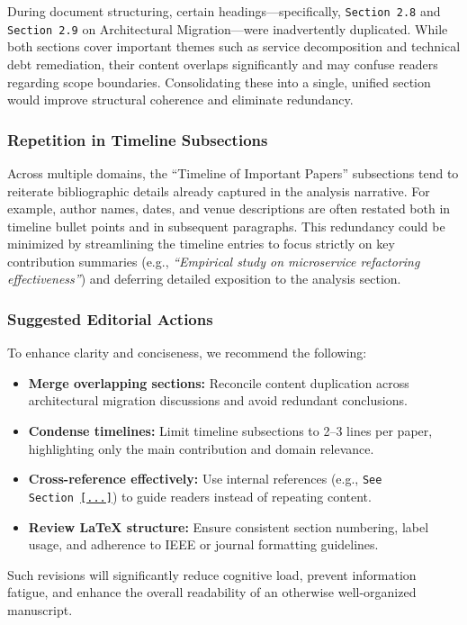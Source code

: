\documentclass[12pt]{article}
\begin{document}
During document structuring, certain headings—specifically, \texttt{Section 2.8} and \texttt{Section 2.9} on Architectural Migration—were inadvertently duplicated. While both sections cover important themes such as service decomposition and technical debt remediation, their content overlaps significantly and may confuse readers regarding scope boundaries. Consolidating these into a single, unified section would improve structural coherence and eliminate redundancy.

\subsubsection{Repetition in Timeline Subsections}

Across multiple domains, the “Timeline of Important Papers” subsections tend to reiterate bibliographic details already captured in the analysis narrative. For example, author names, dates, and venue descriptions are often restated both in timeline bullet points and in subsequent paragraphs. This redundancy could be minimized by streamlining the timeline entries to focus strictly on key contribution summaries (e.g., \textit{“Empirical study on microservice refactoring effectiveness”}) and deferring detailed exposition to the analysis section.

\subsubsection{Suggested Editorial Actions}

To enhance clarity and conciseness, we recommend the following:
\begin{itemize}
    \item \textbf{Merge overlapping sections:} Reconcile content duplication across architectural migration discussions and avoid redundant conclusions.
    \item \textbf{Condense timelines:} Limit timeline subsections to 2–3 lines per paper, highlighting only the main contribution and domain relevance.
    \item \textbf{Cross-reference effectively:} Use internal references (e.g., \texttt{See Section~\ref{...}}) to guide readers instead of repeating content.
    \item \textbf{Review LaTeX structure:} Ensure consistent section numbering, label usage, and adherence to IEEE or journal formatting guidelines.
\end{itemize}

Such revisions will significantly reduce cognitive load, prevent information fatigue, and enhance the overall readability of an otherwise well-organized manuscript.
\end{document}
